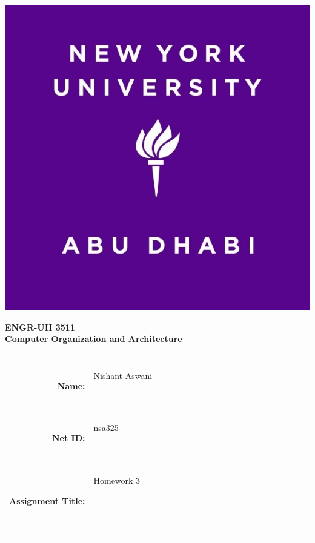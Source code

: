 \documentclass[11pt]{exam}
\newcommand{\myname}{Nishant Aswani}
\newcommand{\mynetid}{nsa325}
\newcommand{\myhwtype}{Homework}
\newcommand{\myhwnum}{3}
\newcommand{\mycoursenumber}{ENGR-UH 3511}
\newcommand{\myclassname}{Computer Organization and Architecture}
\begin{document}
\begin{center}
  \includegraphics[scale=0.15]{etc/NYUAD-alt-logo.jpg}
\end{center}

{\vspace{1.5em}}

\begin{center}
    \Huge{\textbf{\mycoursenumber}}\\
    {\vspace{0.5em}}
    \Huge{\textbf{\myclassname}}
\end{center}

{\vspace{10em}}

\begin{center}
  \begin{tabular}{|rp{5.0cm}lll|}
    \hline
    &  &  &  & \\
    &  &  &  & \\
    \Large{\textbf{Name:}} & \Large{\myname}
    
    \  &  &  & \\
    \Large{\textbf{Net ID:}} & \Large{\mynetid}
    
    \  &  &  & \\
    \Large{\textbf{Assignment Title:}} & \Large{\myhwtype{} \myhwnum}
    
    \
    
    \  &  &  & \\
    \hline
  \end{tabular}
\end{center}
\end{document}
